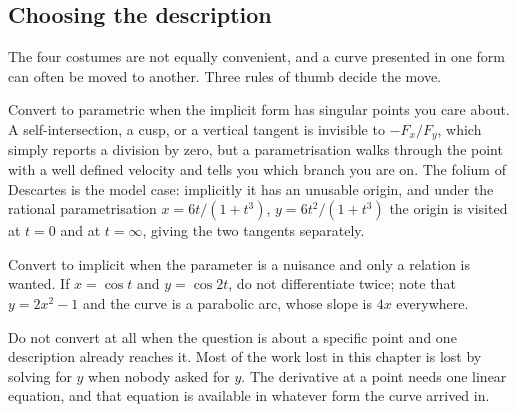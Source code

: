 \subsection{Choosing the description}

The four costumes are not equally convenient, and a curve presented in one form can often be moved to another. Three rules of thumb decide the move.

Convert to parametric when the implicit form has singular points you care about. A self-intersection, a cusp, or a vertical tangent is invisible to $-F_{x}/F_{y}$, which simply reports a division by zero, but a parametrisation walks through the point with a well defined velocity and tells you which branch you are on. The folium of Descartes is the model case: implicitly it has an unusable origin, and under the rational parametrisation $x=6t/(1+t^{3})$, $y=6t^{2}/(1+t^{3})$ the origin is visited at $t=0$ and at $t=\infty$, giving the two tangents separately.

Convert to implicit when the parameter is a nuisance and only a relation is wanted. If $x=\cos t$ and $y=\cos2t$, do not differentiate twice; note that $y=2x^{2}-1$ and the curve is a parabolic arc, whose slope is $4x$ everywhere.

Do not convert at all when the question is about a specific point and one description already reaches it. Most of the work lost in this chapter is lost by solving for $y$ when nobody asked for $y$. The derivative at a point needs one linear equation, and that equation is available in whatever form the curve arrived in.

